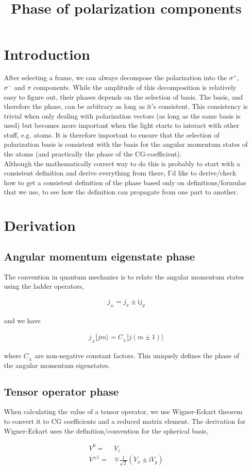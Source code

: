 \documentclass[10pt,fleqn]{article}
\title{Phase of polarization components}
\newcommand{\ui}{\mathrm{i}}
\newcommand{\eqar}[1]
{
  \begin{align}
    #1
  \end{align}
}
\newcommand{\paren}[1]{{\left({#1}\right)}}
\begin{document}
\maketitle

\section{Introduction}
After selecting a frame, we can always decompose the polarization into the
$\sigma^+$, $\sigma^-$ and $\pi$ components. While the amplitude of this decomposition
is relatively easy to figure out, their phases depends on the selection of basis.
The basis, and therefore the phase, can be arbitrary as long as it's consistent.
This consistency is trivial when only dealing with polarization vectors
(as long as the same basis is used) but becomes more important when the light starts
to interact with other stuff, e.g. atoms. It is therefore important to ensure that
the selection of polarization basis is consistent with the basis
for the angular momentum states of the atoms
(and practically the phase of the CG-coefficient).\\

Although the mathematically correct way to do this is probably to start with
a consistent definition and derive everything from there,
I'd like to derive/check how to get a consistent definition of the phase
based only on definitions/formulas that we use, to see how the definition
can propagate from one part to another.

\section{Derivation}
\subsection{Angular momentum eigenstate phase}
The convention in quantum mechanics is to relate the angular momentum states
using the ladder operators,
\eqar{
  j_{\pm}=j_x\pm\ui j_y
}
and we have
\eqar{
  j_{\pm}|jm\rangle=C_{\pm}|j(m\pm1)\rangle
}
where $C_{\pm}$ are non-negative constant factors.
This uniquely defines the phase of the angular momentum eigenstates.

\subsection{Tensor operator phase}
When calculating the value of a tensor operator, we use Wigner-Eckart theorem
to convert it to CG coefficients and a reduced matrix element.
The derivation for Wigner-Eckart uses the definition/convention
for the spherical basis,
\eqar{
  V^0=&V_z\\
  V^{\pm1}=&\mp\frac{1}{\sqrt{2}}\paren{V_x\pm\ui V_y}
}
\end{document}
